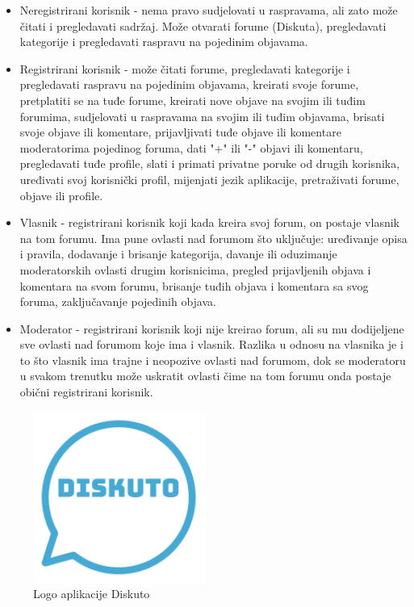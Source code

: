 \documentclass{foi}
\begin{document}
\begin{itemize}
\item Neregistrirani korisnik - nema pravo sudjelovati u raspravama, ali zato može čitati i pregledavati sadržaj. Može otvarati forume (Diskuta), pregledavati kategorije i pregledavati raspravu na pojedinim objavama.
\item Registrirani korisnik - može čitati forume, pregledavati kategorije i pregledavati raspravu na pojedinim objavama, kreirati svoje forume, pretplatiti se na tuđe forume, kreirati nove objave na svojim ili tuđim forumima, sudjelovati u raspravama na svojim ili tuđim objavama, brisati svoje objave ili komentare, prijavljivati tuđe objave ili komentare moderatorima pojedinog foruma, dati "+" ili "-" objavi ili komentaru, pregledavati tuđe profile, slati i primati privatne poruke od drugih korisnika, uređivati svoj korisnički profil, mijenjati jezik aplikacije, pretraživati forume, objave ili profile.
\item Vlasnik - registrirani korisnik koji kada kreira svoj forum, on postaje vlasnik na tom forumu. Ima pune ovlasti nad forumom što uključuje: uređivanje opisa i pravila, dodavanje i brisanje kategorija, davanje ili oduzimanje moderatorskih ovlasti drugim korisnicima, pregled prijavljenih objava i komentara na svom forumu, brisanje tuđih objava i komentara sa svog foruma, zaključavanje pojedinih objava.
\item Moderator - registrirani korisnik koji nije kreirao forum, ali su mu dodijeljene sve ovlasti nad forumom koje ima i vlasnik. Razlika u odnosu na vlasnika je i to što vlasnik ima trajne i neopozive ovlasti nad forumom, dok se moderatoru u svakom trenutku može uskratit ovlasti čime na tom forumu onda postaje obični registrirani korisnik.
\end{itemize}

\begin{figure}[h!]
    \centering
    \includegraphics[width=0.5\textwidth]{slike/logo.png}
    \caption{Logo aplikacije Diskuto}
\end{figure}
\end{document}
